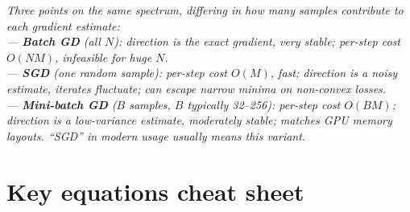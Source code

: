 \documentclass[11pt, a4paper]{article}
\begin{document}
\begin{exambox}
\textit{Three points on the same spectrum, differing in how many samples contribute to each gradient estimate:}\\[0.3em]
\textit{\quad — \textbf{Batch GD} (all $N$): direction is the exact gradient, very stable; per-step cost $O(NM)$, infeasible for huge $N$.}\\
\textit{\quad — \textbf{SGD} (one random sample): per-step cost $O(M)$, fast; direction is a noisy estimate, iterates fluctuate; can escape narrow minima on non-convex losses.}\\
\textit{\quad — \textbf{Mini-batch GD} ($B$ samples, $B$ typically 32--256): per-step cost $O(BM)$; direction is a low-variance estimate, moderately stable; matches GPU memory layouts. ``SGD'' in modern usage usually means this variant.}
\end{exambox}

\section*{Key equations cheat sheet}
\end{document}
